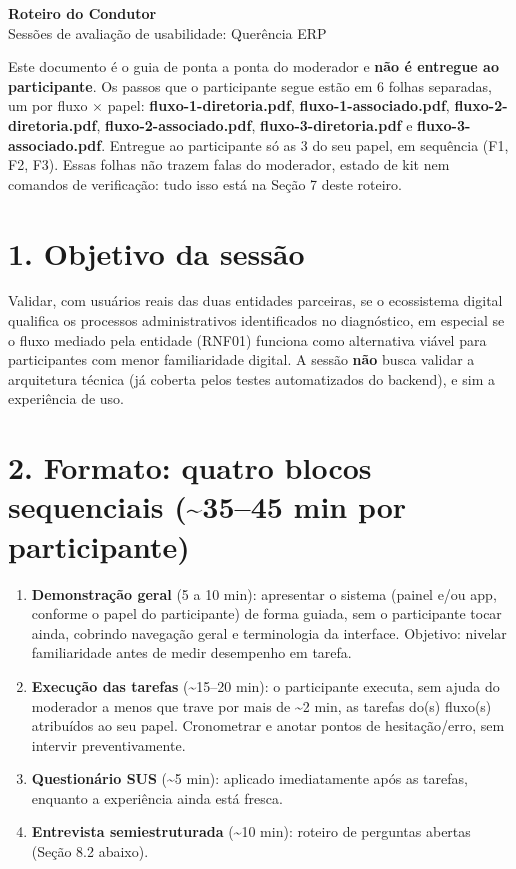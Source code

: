 \documentclass[11pt,a4paper]{article}
\newcommand{\caixa}[1]{%
  \noindent\colorbox{lightbg}{%
    \begin{minipage}{0.95\linewidth}
    \vspace{1mm}
    #1
    \vspace{1mm}
    \end{minipage}%
  }\vspace{3mm}
}
\begin{document}
\begin{center}
  {\LARGE\bfseries\color{brandgreen} Roteiro do Condutor}\\[2mm]
  {\large Sessões de avaliação de usabilidade: Querência ERP}
\end{center}

\vspace{2mm}

\caixa{Este documento é o guia de ponta a ponta do moderador e \textbf{não é entregue ao
participante}. Os passos que o participante segue estão em 6 folhas separadas, um por fluxo
$\times$ papel: \textbf{fluxo-1-diretoria.pdf}, \textbf{fluxo-1-associado.pdf},
\textbf{fluxo-2-diretoria.pdf}, \textbf{fluxo-2-associado.pdf}, \textbf{fluxo-3-diretoria.pdf} e
\textbf{fluxo-3-associado.pdf}. Entregue ao participante só as 3 do seu papel, em sequência (F1,
F2, F3). Essas folhas não trazem falas do moderador, estado de kit nem comandos de verificação:
tudo isso está na Seção 7 deste roteiro.}

\section*{1. Objetivo da sessão}

Validar, com usuários reais das duas entidades parceiras, se o ecossistema digital qualifica os
processos administrativos identificados no diagnóstico, em especial se o fluxo mediado pela
entidade (RNF01) funciona como alternativa viável para participantes com menor familiaridade
digital. A sessão \textbf{não} busca validar a arquitetura técnica (já coberta pelos testes
automatizados do backend), e sim a experiência de uso.

\section*{2. Formato: quatro blocos sequenciais (\textasciitilde35--45 min por participante)}

\begin{enumerate}[leftmargin=6mm]
  \item \textbf{Demonstração geral} (5 a 10 min): apresentar o sistema (painel e/ou
    app, conforme o papel do participante) de forma guiada, sem o participante tocar ainda,
    cobrindo navegação geral e terminologia da interface. Objetivo: nivelar familiaridade antes de
    medir desempenho em tarefa.
  \item \textbf{Execução das tarefas} (\textasciitilde15--20 min): o participante executa, sem
    ajuda do moderador a menos que trave por mais de \textasciitilde2 min, as tarefas do(s)
    fluxo(s) atribuídos ao seu papel. Cronometrar e anotar pontos de hesitação/erro, sem intervir
    preventivamente.
  \item \textbf{Questionário SUS} (\textasciitilde5 min): aplicado imediatamente após as
    tarefas, enquanto a experiência ainda está fresca.
  \item \textbf{Entrevista semiestruturada} (\textasciitilde10 min): roteiro de perguntas
    abertas (Seção 8.2 abaixo).
\end{enumerate}
\end{document}
